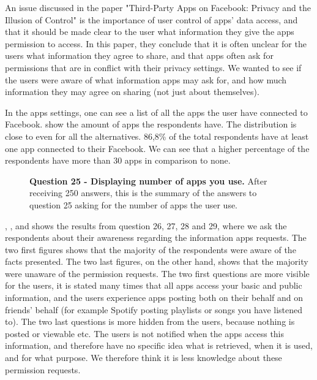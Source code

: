 An issue discussed in the paper "Third-Party Apps on Facebook: Privacy and the Illusion of Control" \cite{thirdPartyApps} is the importance of user control of apps' data access, and that it should be made clear to the user what information they give the apps permission to access. In this paper, they conclude that it is often unclear for the users what information they agree to share, and that apps often ask for permissions that are in conflict with their privacy settings. We wanted to see if the users were aware of what information apps may ask for, and how much information they may agree on sharing (not just about themselves). 

In the apps settings, one can see a list of all the apps the user have connected to Facebook.  show the amount of apps the respondents have. The distribution is close to even for all the alternatives. 86,8\% of the total respondents have at least one app connected to their Facebook. We can see that a higher percentage of the respondents have more than 30 apps in comparison to none. 

\begin{figure}[h!]
\centering
{}
\caption[Question 25 - Displaying number of apps you use]{\textbf{Question 25 - Displaying number of apps you use.} After receiving 250 answers, this is the summary of the answers to question 25 asking for the number of apps the user use.} 
\label{fig:appsyouuse}
\end{figure}

, ,  and  shows the results from question 26, 27, 28 and 29, where we ask the respondents about their awareness regarding the information apps requests. The two first figures shows that the majority of the respondents were aware of the facts presented. The two last figures, on the other hand, shows that the majority were unaware of the permission requests. The two first questions are more visible for the users, it is stated many times that all apps access your basic and public information, and the users experience apps posting both on their behalf and on friends' behalf (for example Spotify posting playlists or songs you have listened to). The two last questions is more hidden from the users, because nothing is posted or viewable etc. The users is not notified when the apps access this information, and therefore have no specific idea what is retrieved, when it is used, and for what purpose. We therefore think it is less knowledge about these permission requests. 

